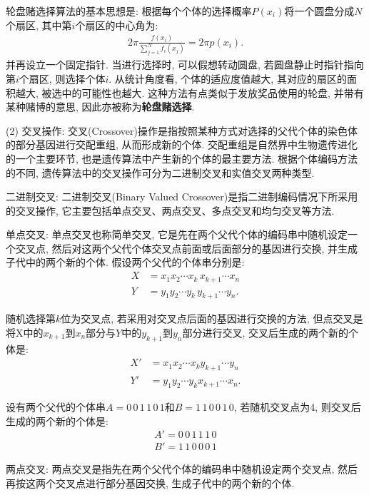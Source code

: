     轮盘赌选择算法的基本思想是: 根据每个个体的选择概率$P(x_i)$将一个圆盘分成$N$个扇区, 其中第$i$个扇区的中心角为:
\begin{align}
    2 \pi \frac{f\left(x_{i}\right)}{\sum_{j=1}^{N} f_{i}\left(x_{j}\right)}=2 \pi p\left(x_{i}\right).
\end{align}
并再设立一个固定指针. 当进行选择时, 可以假想转动圆盘, 若圆盘静止时指针指向第$i$个扇区, 则选择个体$i$.
从统计角度看, 个体的适应度值越大, 其对应的扇区的面积越大, 被选中的可能性也越大. 这种方法有点类似于发放奖品使用的轮盘, 并带有某种赌博的意思, 因此亦被称为\textbf{轮盘赌选择}.

(2) 交叉操作: 交叉(Crossover)操作是指按照某种方式对选择的父代个体的染色体的部分基因进行交配重组, 从而形成新的个体. 交配重组是自然界中生物遗传进化的一个主要环节, 也是遗传算法中产生新的个体的最主要方法. 根据个体编码方法的不同, 遗传算法中的交叉操作可分为二进制交叉和实值交叉两种类型.

     二进制交叉: 二进制交叉(Binary Valued Crossover)是指二进制编码情况下所采用的交叉操作, 它主要包括单点交叉、两点交叉、多点交叉和均匀交叉等方法.

     单点交叉: 单点交叉也称简单交叉, 它是先在两个父代个体的编码串中随机设定一个交叉点, 然后对这两个父代个体交叉点前面或后面部分的基因进行交换, 并生成子代中的两个新的个体. 假设两个父代的个体串分别是:
\begin{align}
    X&=x_1 x_2 \cdots x_k\, x_{k+1} \cdots x_n\\
    Y&=y_1 y_2 \cdots y_k\,  y_{k+1} \cdots y_n.
\end{align}

    随机选择第$k$位为交叉点, 若采用对交叉点后面的基因进行交换的方法, 但点交叉是将X中的$x_{k+1}$到$x_n$部分与$Y$中的$y_{k+1}$到$y_n$部分进行交叉, 交叉后生成的两个新的个体是:
\begin{align}
    X'&= x_1 x_2 \cdots x_k y_{k+1} \cdots y_n\\
    Y'&= y_1 y_2 \cdots y_k x_{k+1} \cdots x_n.
\end{align}
\begin{example}
    设有两个父代的个体串$A=0\, 0\,  1\,  1\,  0\,  1$和$B=1\,  1\,  0\,  0\,  1\,  0$, 若随机交叉点为4, 则交叉后生成的两个新的个体是:
\begin{align}
    A'= 0\, 0\, 1\, 1\, 1\, 0\\
    B'= 1\, 1\, 0\, 0\, 0\, 1
\end{align}
\end{example}

     两点交叉: 两点交叉是指先在两个父代个体的编码串中随机设定两个交叉点, 然后再按这两个交叉点进行部分基因交换, 生成子代中的两个新的个体.

